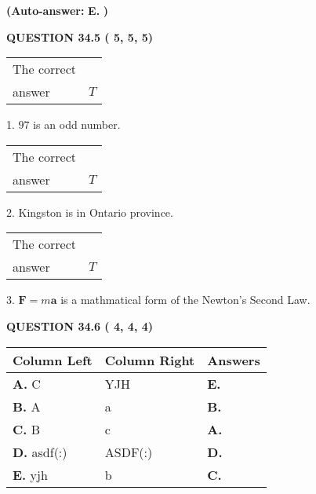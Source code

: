 \documentclass[12pt]{article}
\begin{document}
 
{\textbf{(Auto-answer:}}
{\textbf{\large{
E.}}}
{\textbf{)}}
 
 
  
  
{\textbf{\large{QUESTION
34.5 
 (          5,          5,          5)
}}}

 
\noindent\begin{tabular}{|l|l|}\hline The correct & \\
          answer &  %
$T$ \\ \hline \end{tabular}
1. $ %
97$ is an  %
odd number.
 
\noindent\begin{tabular}{|l|l|}\hline The correct & \\
          answer &  %
$T$ \\ \hline \end{tabular}
2.  %
Kingston is in  %
Ontario province.
 
\noindent\begin{tabular}{|l|l|}\hline The correct & \\
          answer &  %
$T$ \\ \hline \end{tabular}
3.  %
$\mathbf{F}=m\mathbf{a}$ is a mathmatical form of  %
the Newton's Second Law.
 
  
  
{\textbf{\large{QUESTION
34.6 
 (          4,          4,          4)
}}}
 
 
\noindent{}
  
  
\begin{tabular}{|l|l|l|}
 \hline
 Column Left & Column Right  & Answers       \\ 
 \hline
{\textbf{\large{
A.}}}
C
  & 
YJH
 & 
{\textbf{\large{
E.}}}
 \\ 
 \hline
{\textbf{\large{
B.}}}
A
  & 
a
 & 
{\textbf{\large{
B.}}}
 \\ 
 \hline
{\textbf{\large{
C.}}}
B
  & 
c
 & 
{\textbf{\large{
A.}}}
 \\ 
 \hline
{\textbf{\large{
D.}}}
asdf(:)
  & 
ASDF(:)
 & 
{\textbf{\large{
D.}}}
 \\ 
 \hline
{\textbf{\large{
E.}}}
yjh
  & 
b
 & 
{\textbf{\large{
C.}}}
 \\ 
 \hline
 \end{tabular}
  
  
\noindent{}
 
\end{document}
